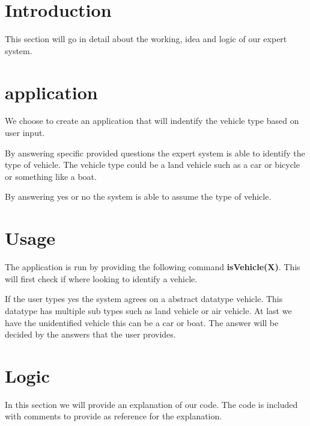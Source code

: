 \section{Introduction} \label{man-introduction}
This section will go in detail about the working, idea and logic of our expert system.

\section{application} \label{man-application}
We choose to create an application that will indentify the vehicle type based on user input.

By answering specific provided questions the expert system is able to identify the type of vehicle.
The vehicle type could be a land vehicle such as a car or bicycle or something like a boat.

By answering yes or no the system is able to assume the type of vehicle.


\section{Usage} \label{man-usage}
The application is run by providing the following command \textbf{isVehicle(X)}.
This will first check if where looking to identify a vehicle.

If the user types yes the system agrees on a abstract datatype vehicle.
This datatype has multiple sub types such as land vehicle or air vehicle. At last we have the unidentified
vehicle this can be a car or boat.
The answer will be decided by the answers that the user provides.

\newpage
\section{Logic} \label{man-logic}
In this section we will provide an explanation of our code.
The code is included with comments to provide as reference for the explanation.


